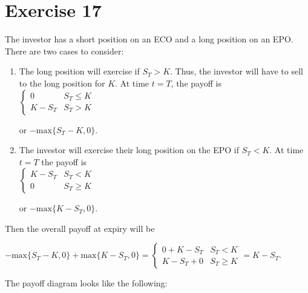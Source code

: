 \documentclass{article}
\begin{document}
\section*{Exercise 17}
The investor has a short position on an ECO and a long position on an EPO. There are two cases to consider:
\begin{enumerate}
    \item The long position will exercise if $S_T > K$. Thus, the investor will have to sell to the long position for $K$. At time $t=T$, the payoff is \\
    
    $\begin{cases}
        0 & S_T \leq K \\
        K - S_T & S_T > K
    \end{cases}$

    or $-\text{max}\{S_T-K, 0\}$.

    \item The investor will exercise their long position on the EPO if $S_T < K$. At time $t=T$ the payoff is \\
    
    $\begin{cases}
        K-S_T & S_T < K \\
        0 & S_T \geq K
    \end{cases}$

    or $-\text{max}\{K-S_T, 0\}$.
\end{enumerate}
Then the overall payoff at expiry will be 
\begin{center}
    $-\text{max}\{S_T-K, 0\} + \text{max}\{K-S_T, 0\} = 
    \begin{cases}
        0 + K - S_T & S_T < K \\
        K - S_T + 0 & S_T \geq K
    \end{cases}
    = K - S_T$.
\end{center}
The payoff diagram looks like the following: 
\begin{center}
\end{center}
\end{document}
